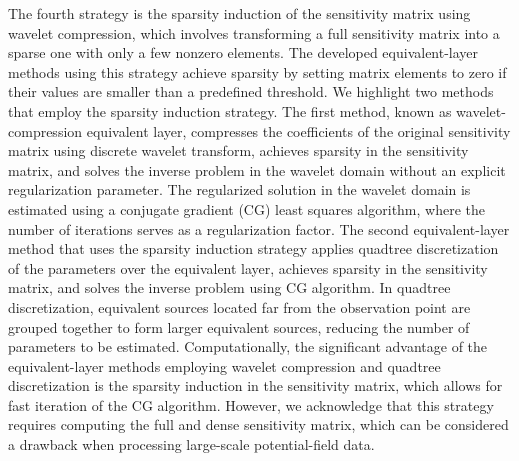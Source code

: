 The fourth strategy is the sparsity induction of the sensitivity matrix using wavelet compression, which involves transforming a full sensitivity matrix into a sparse one with only a few nonzero elements.
The developed equivalent-layer methods using this strategy achieve sparsity by setting matrix elements to zero if their values are smaller than a predefined threshold.
We highlight two methods that employ the sparsity induction strategy.
The first method, known as wavelet-compression equivalent layer, compresses the coefficients of the original sensitivity matrix using discrete wavelet transform, achieves sparsity in the sensitivity matrix, and solves the inverse problem in the wavelet domain without an explicit regularization parameter.
The regularized solution in the wavelet domain is estimated using a conjugate gradient (CG) least squares algorithm, where the number of iterations serves as a regularization factor.
The second equivalent-layer method that uses the sparsity induction strategy applies quadtree discretization of the parameters over the equivalent layer, achieves sparsity in the sensitivity matrix, and solves the inverse problem using CG algorithm.
In quadtree discretization, equivalent sources located far from the observation point are grouped together to form larger equivalent sources, reducing the number of parameters to be estimated.
Computationally, the significant advantage of the equivalent-layer methods employing wavelet compression and quadtree discretization is the sparsity induction in the sensitivity matrix, which allows for fast iteration of the CG algorithm.
However, we acknowledge that this strategy requires computing the full and dense sensitivity matrix, which can be considered a drawback when processing large-scale potential-field data.

